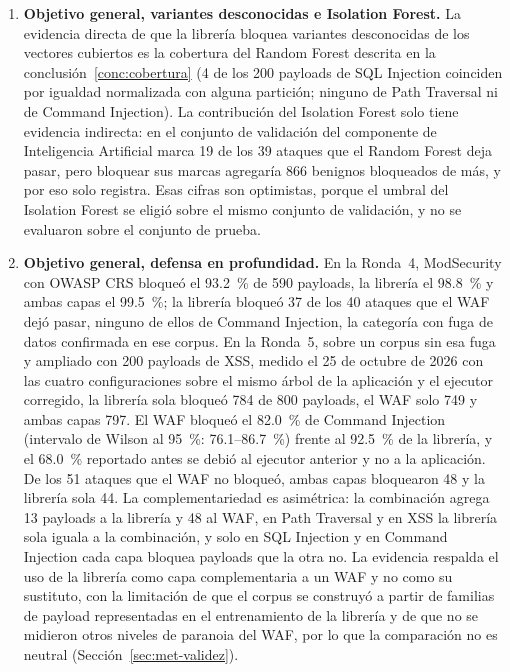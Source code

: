 \begin{enumerate}
    \item \textbf{Objetivo general, variantes desconocidas e Isolation Forest.}\label{conc:variantes}
    La evidencia directa de que la librería bloquea variantes desconocidas de los vectores cubiertos
    es la cobertura del Random Forest descrita en la conclusión~\ref{conc:cobertura} (4 de los 200 payloads de SQL
    Injection coinciden por igualdad normalizada con alguna partición; ninguno de Path Traversal ni
    de Command Injection). La contribución del Isolation Forest solo tiene evidencia indirecta: en
    el conjunto de validación del componente de Inteligencia Artificial \cite{valenzuela2026ia} marca 19 de los 39 ataques
    que el Random Forest deja pasar, pero bloquear sus marcas agregaría 866 benignos bloqueados de
    más, y por eso solo registra. Esas cifras son optimistas, porque el umbral del Isolation Forest
    se eligió sobre el mismo conjunto de validación, y no se evaluaron sobre el conjunto de prueba.

    \item \textbf{Objetivo general, defensa en profundidad.}\label{conc:waf} En la Ronda~4, ModSecurity con OWASP CRS
    bloqueó el 93.2~\% de 590 payloads, la librería el 98.8~\% y ambas capas el 99.5~\%; la librería
    bloqueó 37 de los 40 ataques que el WAF dejó pasar, ninguno de ellos de Command Injection, la
    categoría con fuga de datos confirmada en ese corpus. En la Ronda~5, sobre un corpus sin esa fuga y ampliado
    con 200 payloads de XSS, medido el 25 de octubre de 2026 con las cuatro configuraciones sobre
    el mismo árbol de la aplicación y el ejecutor corregido, la librería sola bloqueó 784 de 800
    payloads, el WAF solo 749 y ambas capas 797. El WAF bloqueó el 82.0~\% de Command Injection
    (intervalo de Wilson al 95~\%: 76.1--86.7~\%) frente al 92.5~\% de la librería, y el 68.0~\%
    reportado antes se debió al ejecutor anterior y no a la aplicación. De los 51 ataques que el WAF
    no bloqueó, ambas capas bloquearon 48 y la librería sola 44. La complementariedad es asimétrica:
    la combinación agrega 13 payloads a la librería y 48 al WAF, en Path Traversal y en XSS la
    librería sola iguala a la combinación, y solo en SQL Injection y en Command Injection cada capa
    bloquea payloads que la otra no. La evidencia respalda el uso de la librería como capa
    complementaria a un WAF y no como su sustituto, con la limitación de que el corpus se construyó
    a partir de familias de payload representadas en el entrenamiento de la librería y de que no se
    midieron otros niveles de paranoia del WAF, por lo que la comparación no es neutral
    (Sección~\ref{sec:met-validez}).


\end{enumerate}
